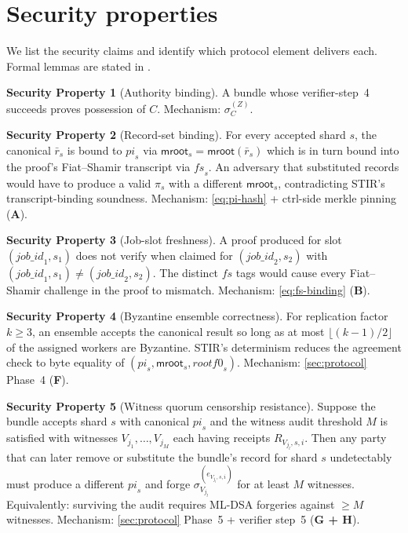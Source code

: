 \documentclass[11pt,a4paper]{article}
\theoremstyle{definition}
\newtheorem{property}{Security Property}
\theoremstyle{plain}
\newcommand{\sig}[2]{\ensuremath{\sigma_{#1}^{(#2)}}}
\begin{document}
\section{Security properties}
\label{sec:security}

We list the security claims and identify which protocol element
delivers each.  Formal lemmas are stated in
.

\begin{property}[Authority binding]
\label{prop:authority}
A bundle whose verifier-step~4 succeeds proves possession of $C$.
Mechanism: $\sig{C}{Z}$.
\end{property}

\begin{property}[Record-set binding]
\label{prop:records}
For every accepted shard $s$, the canonical $\bar{r}_s$ is bound to
$\mathit{pi}_s$ via $\mathsf{mroot}_s = \mathsf{mroot}(\bar{r}_s)$
which is in turn bound into the proof's Fiat--Shamir transcript via
$\mathit{fs}_s$.  An adversary that substituted records would have
to produce a valid $\pi_s$ with a different
$\mathsf{mroot}_s$, contradicting STIR's transcript-binding soundness.
Mechanism: \cref{eq:pi-hash} + ctrl-side merkle pinning (\textbf{A}).
\end{property}

\begin{property}[Job-slot freshness]
\label{prop:fresh}
A proof produced for slot $(\mathit{job\_id}_1, s_1)$ does not verify
when claimed for $(\mathit{job\_id}_2, s_2)$ with
$(\mathit{job\_id}_1, s_1) \ne (\mathit{job\_id}_2, s_2)$.  The
distinct $\mathit{fs}$ tags would cause every Fiat--Shamir challenge
in the proof to mismatch.
Mechanism: \cref{eq:fs-binding} (\textbf{B}).
\end{property}

\begin{property}[Byzantine ensemble correctness]
\label{prop:byzantine}
For replication factor $k \ge 3$, an ensemble accepts the canonical
result so long as at most $\lfloor (k-1)/2 \rfloor$ of the assigned
workers are Byzantine.  STIR's determinism reduces the agreement
check to byte equality of $(\mathit{pi}_s, \mathsf{mroot}_s,
\mathit{rootf0}_s)$.
Mechanism: \cref{sec:protocol} Phase~4 (\textbf{F}).
\end{property}

\begin{property}[Witness quorum censorship resistance]
\label{prop:witness}
Suppose the bundle accepts shard $s$ with canonical $\mathit{pi}_s$
and the witness audit threshold $M$ is satisfied with witnesses
$V_{j_1}, \dots, V_{j_M}$ each having receipts $R_{V_{j_l}, s, i}$.
Then any party that can later remove or substitute the bundle's
record for shard $s$ undetectably must produce a different
$\mathit{pi}_s$ and forge $\sig{V_{j_l}}{e_{V_{j_l}, s, i}}$ for at
least $M$ witnesses.  Equivalently: surviving the audit requires
ML-DSA forgeries against $\ge M$ witnesses.
Mechanism: \cref{sec:protocol} Phase~5 + verifier step~5
(\textbf{G + H}).
\end{property}
\end{document}
